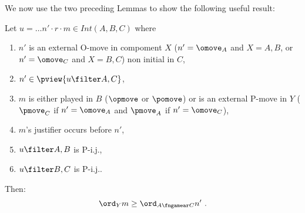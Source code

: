 We now use the two preceding Lemmas to show
the following useful result:
\begin{lemma}
\label{lem:increasing_order}
Let $u = \ldots n' \cdot r \cdot m \in Int(A,B,C)$ where
\begin{enumerate}
\item 
$n'$ is an external O-move in compoment $X$ 
($n'=\omove_A$ and $X=A,B$, or $n'=\omove_C$ and $X=B,C$)  non initial in $C$,
\item $n' \in \pview{u\filter A,C}$,
\item $m$ is either played in $B$ 
($\opmove$ or $\pomove$) or is an external
 P-move in $Y$
($\pmove_C$ if $n'=\omove_A$ and 
$\pmove_A$ if $n'=\omove_C$),
\item $m$'s justifier occurs before $n'$,
\item $u\filter A,B$ is P-i.j.,
\item $u\filter B,C$ is P-i.j..
\end{enumerate}
Then:
$$ \ord_{Y} m \geq \ord_{A\fngamear C} n' \ .$$
\end{lemma}
